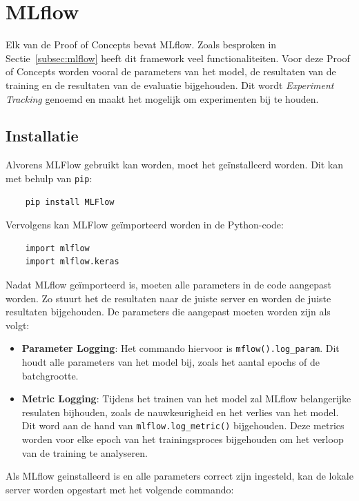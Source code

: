 
\section{MLflow}

Elk van de Proof of Concepts bevat MLflow. Zoals besproken in Sectie~\ref{subsec:mlflow} heeft dit framework veel functionaliteiten. Voor deze Proof of Concepts worden vooral de parameters van het model, de resultaten van de training en de resultaten van de evaluatie bijgehouden. Dit wordt \textit{Experiment Tracking} genoemd en maakt het mogelijk om experimenten bij te houden.

\subsection{Installatie}

Alvorens MLFlow gebruikt kan worden, moet het geïnstalleerd worden. Dit kan met behulp van \texttt{pip}:

\begin{verbatim}
    pip install MLFlow
\end{verbatim}

Vervolgens kan MLFlow geïmporteerd worden in de Python-code:

\begin{verbatim}
    import mlflow
    import mlflow.keras
\end{verbatim}

Nadat MLflow geïmporteerd is, moeten alle parameters in de code aangepast worden. Zo stuurt het de resultaten naar de juiste server en worden de juiste resultaten bijgehouden. De parameters die aangepast moeten worden zijn als volgt:

\begin{itemize}
    \item \textbf{Parameter Logging}: Het commando hiervoor is \texttt{mflow().log\_param}. Dit houdt alle parameters van het model bij, zoals het aantal epochs of de batchgrootte.
    \item \textbf{Metric Logging}: Tijdens het trainen van het model zal MLflow belangerijke resulaten bijhouden, zoals de nauwkeurigheid en het verlies van het model. Dit word aan de hand van \texttt{mlflow.log\_metric()} bijgehouden. Deze metrics worden voor elke epoch van het trainingsproces bijgehouden om het verloop van de training te analyseren.
\end{itemize}

Als MLflow geinstalleerd is en alle parameters correct zijn ingesteld, kan de lokale server worden opgestart met het volgende commando:

